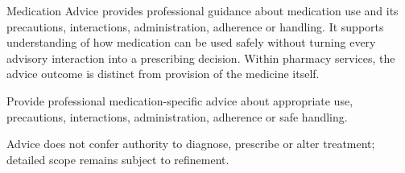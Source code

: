 Medication Advice provides professional guidance about medication use and its precautions, interactions, administration, adherence or handling. It supports understanding of how medication can be used safely without turning every advisory interaction into a prescribing decision. Within pharmacy services, the advice outcome is distinct from provision of the medicine itself.



Provide professional medication-specific advice about appropriate use, precautions, interactions, administration, adherence or safe handling.



Advice does not confer authority to diagnose, prescribe or alter treatment; detailed scope remains subject to refinement.


